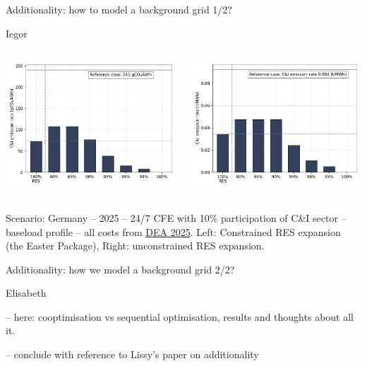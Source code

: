 \begin{frame}{Additionality: how to model a background grid 1/2?}

  Iegor

  \begin{columns}
    \begin{column}{7cm}
      \includegraphics[width=7.5cm]{images/10-2025-DE-p3-ci_emisrate.pdf}
    \end{column}
    \begin{column}{7cm}
      \includegraphics[width=7.5cm]{images/ci_emisrate.pdf}
    \end{column}
  \end{columns}

  Scenario: Germany -- 2025 -- 24/7 CFE with 10\% participation of C\&I sector -- baseload profile -- all costs from \href{https://ens.dk/en/our-services/technology-catalogues}{DEA 2025}. Left: Constrained RES expansion (the Easter Package), Right: unconstrained RES expansion.
\end{frame}


\begin{frame}{Additionality: how we model a background grid 2/2?}

  Elisabeth

  -- here: cooptimisation vs sequential optimisation, results and thoughts about all it.

  -- conclude with reference to Lissy's paper on additionality

\end{frame}

